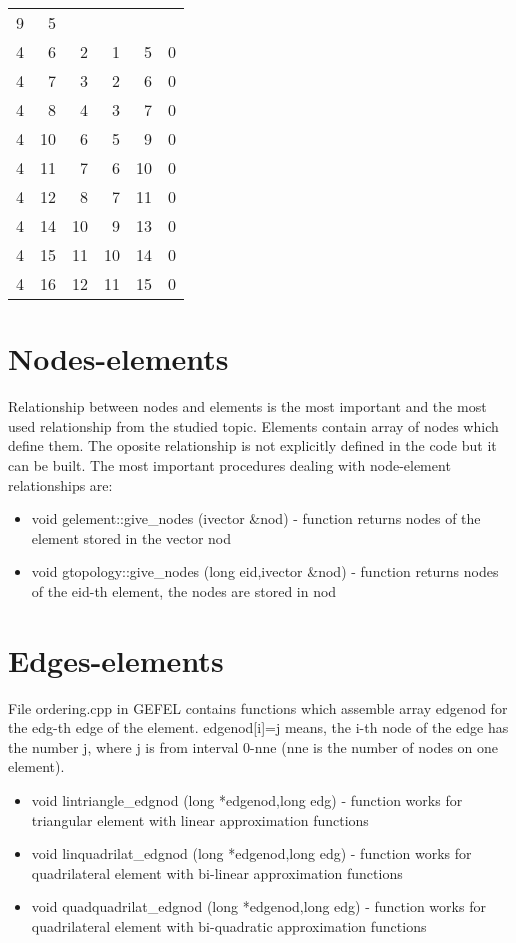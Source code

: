 \begin{tabular}{rrrrrr}
9 &  5 &    &    &    &
\\
4 &  6 &  2 &  1 &  5 & 0
\\
4 &  7 &  3 &  2 &  6 & 0
\\
4 &  8 &  4 &  3 &  7 & 0
\\
4 & 10 &  6 &  5 &  9 & 0
\\
4 & 11 &  7 &  6 & 10 & 0
\\
4 & 12 &  8 &  7 & 11 & 0
\\
4 & 14 & 10 &  9 & 13 & 0
\\
4 & 15 & 11 & 10 & 14 & 0
\\
4 & 16 & 12 & 11 & 15 & 0
\\
\end{tabular}

\section{Nodes-elements}

Relationship between nodes and elements is the most important and the most
used relationship from the studied topic. Elements contain array of
nodes which define them. The oposite relationship is not explicitly
defined in the code but it can be built. The most important procedures
dealing with node-element relationships are:

\begin{itemize}
\item
void gelement::give\_nodes (ivector \&nod) - function returns nodes
of the element stored in the vector nod
\item
void gtopology::give\_nodes (long eid,ivector \&nod) - function returns
nodes of the eid-th element, the nodes are stored in nod
\end{itemize}


\section{Edges-elements}

File ordering.cpp in GEFEL contains functions which assemble array edgenod for
the edg-th edge of the element. edgenod[i]=j means, the i-th node of the edge
has the number j, where j is from interval 0-nne (nne is the number of nodes
on one element).

\begin{itemize}
\item
void lintriangle\_edgnod (long *edgenod,long edg) - function works for triangular element
with linear approximation functions
\item
void linquadrilat\_edgnod (long *edgenod,long edg) - function works for quadrilateral
element with bi-linear approximation functions
\item
void quadquadrilat\_edgnod (long *edgenod,long edg) - function works for quadrilateral
element with bi-quadratic approximation functions
\end{itemize}

